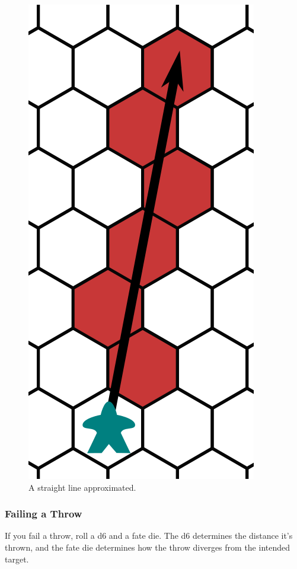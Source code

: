 \begin{figure}
    \centering
    \includegraphics{the-game/throwing-cropped.png}
    \caption{A straight line approximated.}
    \label{fig:line-throw}
\end{figure}

\subsubsection{Failing a Throw}
If you fail a throw, roll a d6 and a fate die.
The d6 determines the distance it’s thrown, and the fate die determines how the throw diverges from the intended target.

